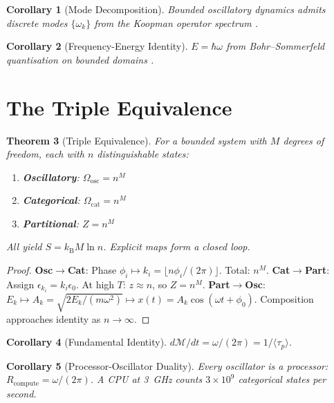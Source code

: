 \documentclass[11pt,twocolumn,a4paper]{article}
\newtheorem{theorem}{Theorem}[section]
\newtheorem{corollary}[theorem]{Corollary}
\theoremstyle{definition}
\theoremstyle{remark}
\newcommand{\kB}{k_{\mathrm{B}}}
\newcommand{\Depth}{\mathcal{M}}
\newcommand{\taup}{\tau_p}
\begin{document}
\begin{corollary}[Mode Decomposition]
Bounded oscillatory dynamics admits discrete modes $\{\omega_k\}$ from the Koopman operator spectrum \citep{koopman1931}.
\end{corollary}

\begin{corollary}[Frequency-Energy Identity]
$E = \hbar\omega$ from Bohr--Sommerfeld quantisation on bounded domains \citep{bohr1913, planck1901}.
\end{corollary}

\section{The Triple Equivalence}
\label{sec:triple}

\begin{theorem}[Triple Equivalence]
\label{thm:triple}
For a bounded system with $M$ degrees of freedom, each with $n$ distinguishable states:
\begin{enumerate}[nosep]
\item \textbf{Oscillatory}: $\Omega_{\mathrm{osc}} = n^M$
\item \textbf{Categorical}: $\Omega_{\mathrm{cat}} = n^M$
\item \textbf{Partitional}: $Z = n^M$
\end{enumerate}
All yield $S = \kB M \ln n$. Explicit maps form a closed loop.
\end{theorem}

\begin{proof}
\textbf{Osc$\to$Cat}: Phase $\phi_i \mapsto k_i = \lfloor n\phi_i/(2\pi)\rfloor$. Total: $n^M$. \textbf{Cat$\to$Part}: Assign $\epsilon_{k_i} = k_i\epsilon_0$. At high $T$: $z \approx n$, so $Z = n^M$. \textbf{Part$\to$Osc}: $E_k \mapsto A_k = \sqrt{2E_k/(m\omega^2)} \mapsto x(t) = A_k\cos(\omega t + \phi_0)$. Composition approaches identity as $n \to \infty$.
\end{proof}

\begin{corollary}[Fundamental Identity]
\label{cor:fundamental}
$d\Depth/dt = \omega/(2\pi) = 1/\langle\taup\rangle$.
\end{corollary}

\begin{corollary}[Processor-Oscillator Duality]
Every oscillator is a processor: $R_{\mathrm{compute}} = \omega/(2\pi)$. A CPU at 3~GHz counts $3\times 10^9$ categorical states per second.
\end{corollary}
\end{document}
